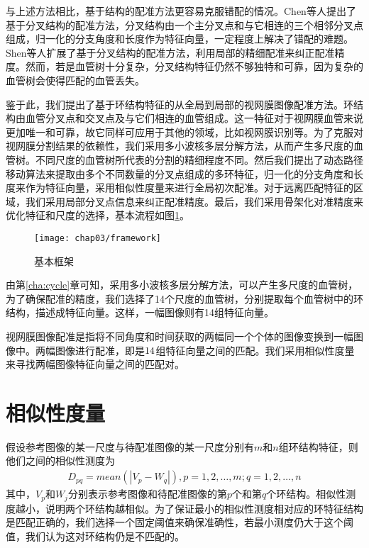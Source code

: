 与上述方法相比，基于结构的配准方法更容易克服错配的情况。Chen\cite{chen2011retinal,chen2015retinal}等人提出了基于分叉结构的配准方法，分叉结构由一个主分叉点和与它相连的三个相邻分叉点组成，归一化的分支角度和长度作为特征向量，一定程度上解决了错配的难题。Shen\cite{shen2012blood}等人扩展了基于分叉结构的配准方法，利用局部的精细配准来纠正配准精度。然而，若是血管树十分复杂，分叉结构特征仍然不够独特和可靠，因为复杂的血管树会使得匹配的血管丢失。

鉴于此，我们提出了基于环结构特征的从全局到局部的视网膜图像配准方法。环结构由血管分叉点和交叉点及与它们相连的血管组成。这一特征对于视网膜血管来说更加唯一和可靠，故它同样可应用于其他的领域，比如视网膜识别等。为了克服对视网膜分割结果的依赖性，我们采用多小波核多层分解方法，从而产生多尺度的血管树。不同尺度的血管树所代表的分割的精细程度不同。然后我们提出了动态路径移动算法来提取由多个不同数量的分叉点组成的多环特征，归一化的分支角度和长度来作为特征向量，采用相似性度量来进行全局初次配准。对于远离匹配特征的区域，我们采用局部分叉点信息来纠正配准精度。最后，我们采用骨架化对准精度来优化特征和尺度的选择，基本流程如图\ref{fig:framework}。
\begin{figure}[!ht]
  \centering
  \texttt{[image: chap03/framework]}
  \caption{基本框架}
  \label{fig:framework}
\end{figure}


由第\ref{cha:cycle}章可知，采用多小波核多层分解方法，可以产生多尺度的血管树，为了确保配准的精度，我们选择了14个尺度的血管树，分别提取每个血管树中的环结构，描述成特征向量。这样，一幅图像则有14组特征向量。

视网膜图像配准是指将不同角度和时间获取的两幅同一个个体的图像变换到一幅图像中。两幅图像进行配准，即是$14 \time 14$组特征向量之间的匹配。我们采用相似性度量来寻找两幅图像特征向量之间的匹配对。

\section{相似性度量}
\label{cha:similarity}

假设参考图像的某一尺度与待配准图像的某一尺度分别有$m$和$n$组环结构特征，则他们之间的相似性测度为
\begin{align}
D_{pq} = mean(|V_p-W_q|), p = 1, 2, \ldots, m; q = 1, 2, \ldots, n
\end{align}
其中，$V_p$和$W_j$分别表示参考图像和待配准图像的第$p$个和第$q$个环结构。相似性测度越小，说明两个环结构越相似。为了保证最小的相似性测度相对应的环特征结构是匹配正确的，我们选择一个固定阈值来确保准确性，若最小测度仍大于这个阈值，我们认为这对环结构仍是不匹配的。

